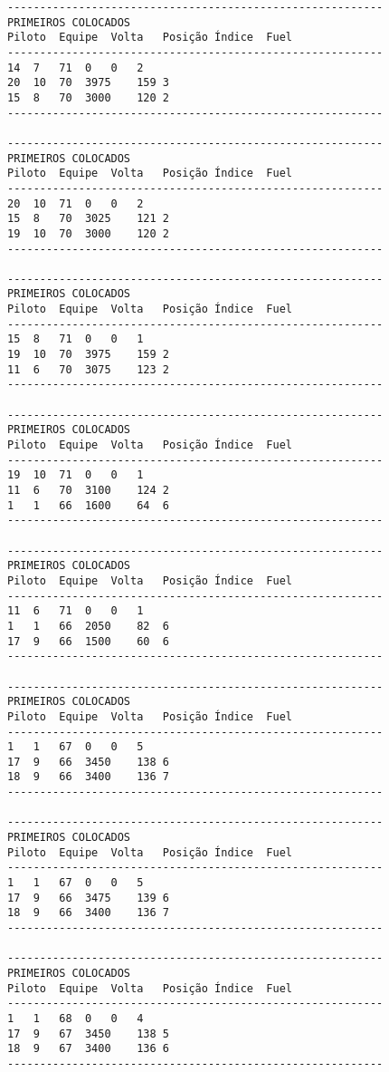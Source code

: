\documentclass[12pt]{article}
\begin{document}
\begin{verbatim}
----------------------------------------------------------
PRIMEIROS COLOCADOS
Piloto	Equipe	Volta	Posição	Índice	Fuel
----------------------------------------------------------
14	7	71	0	0	2
20	10	70	3975	159	3
15	8	70	3000	120	2
----------------------------------------------------------

----------------------------------------------------------
PRIMEIROS COLOCADOS
Piloto	Equipe	Volta	Posição	Índice	Fuel
----------------------------------------------------------
20	10	71	0	0	2
15	8	70	3025	121	2
19	10	70	3000	120	2
----------------------------------------------------------

----------------------------------------------------------
PRIMEIROS COLOCADOS
Piloto	Equipe	Volta	Posição	Índice	Fuel
----------------------------------------------------------
15	8	71	0	0	1
19	10	70	3975	159	2
11	6	70	3075	123	2
----------------------------------------------------------

----------------------------------------------------------
PRIMEIROS COLOCADOS
Piloto	Equipe	Volta	Posição	Índice	Fuel
----------------------------------------------------------
19	10	71	0	0	1
11	6	70	3100	124	2
1	1	66	1600	64	6
----------------------------------------------------------

----------------------------------------------------------
PRIMEIROS COLOCADOS
Piloto	Equipe	Volta	Posição	Índice	Fuel
----------------------------------------------------------
11	6	71	0	0	1
1	1	66	2050	82	6
17	9	66	1500	60	6
----------------------------------------------------------

----------------------------------------------------------
PRIMEIROS COLOCADOS
Piloto	Equipe	Volta	Posição	Índice	Fuel
----------------------------------------------------------
1	1	67	0	0	5
17	9	66	3450	138	6
18	9	66	3400	136	7
----------------------------------------------------------

----------------------------------------------------------
PRIMEIROS COLOCADOS
Piloto	Equipe	Volta	Posição	Índice	Fuel
----------------------------------------------------------
1	1	67	0	0	5
17	9	66	3475	139	6
18	9	66	3400	136	7
----------------------------------------------------------

----------------------------------------------------------
PRIMEIROS COLOCADOS
Piloto	Equipe	Volta	Posição	Índice	Fuel
----------------------------------------------------------
1	1	68	0	0	4
17	9	67	3450	138	5
18	9	67	3400	136	6
----------------------------------------------------------


\end{verbatim}
\end{document}
